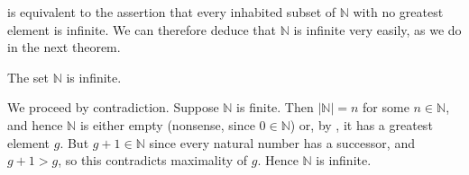  is equivalent to the assertion that every inhabited subset of $\mathbb{N}$ with no greatest element is infinite. We can therefore deduce that $\mathbb{N}$ is infinite very easily, as we do in the next theorem.

\begin{theorem}
\label{thmNIsInfinite}
The set $\mathbb{N}$ is infinite.
\end{theorem}

\begin{cproof}
We proceed by contradiction. Suppose $\mathbb{N}$ is finite. Then $|\mathbb{N}| = n$ for some $n \in \mathbb{N}$, and hence $\mathbb{N}$ is either empty (nonsense, since $0 \in \mathbb{N}$) or, by , it has a greatest element $g$. But $g+1 \in \mathbb{N}$ since every natural number has a successor, and $g+1 > g$, so this contradicts maximality of $g$. Hence $\mathbb{N}$ is infinite.
\end{cproof}